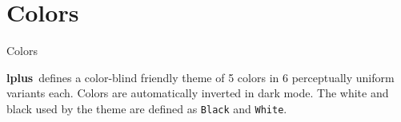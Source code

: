\documentclass[aspectratio=169,colorblocks,darkmode]{beamer}
\newcommand{\themename}{\textbf{lplus}~}
\begin{document}
\section{Colors}
\begin{frame}{Colors}

\themename defines a color-blind friendly theme of 5 colors in 6 perceptually uniform variants each. Colors are automatically inverted in dark mode. The white and black used by the theme are defined as \texttt{Black} and \texttt{White}.

\begin{center}
\end{center}
\end{frame}
\end{document}
